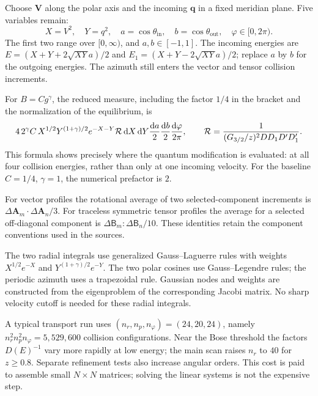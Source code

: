 Choose $\mathbf V$ along the polar axis and the incoming $\mathbf q$ in
a fixed meridian plane. Five variables remain:
\begin{equation}
 X=V^2,\quad Y=q^2,\quad
 a=\cos\theta_{\mathrm{in}},\quad b=\cos\theta_{\mathrm{out}},\quad
 \varphi\in[0,2\pi).
\end{equation}
The first two range over $[0,\infty)$, and $a,b\in[-1,1]$.
The incoming energies are
$E=(X+Y+2\sqrt{XY}a)/2$ and $E_1=(X+Y-2\sqrt{XY}a)/2$;
replace $a$ by $b$ for the outgoing energies. The azimuth still enters
the vector and tensor collision increments.

For $B=Cg^\gamma$, the reduced measure, including the factor $1/4$ in the
bracket and the normalization of the equilibrium, is
\begin{equation}
 4\,2^\gamma C\,
 X^{1/2}Y^{(1+\gamma)/2}e^{-X-Y}
 \mathcal R\,\mathrm d X\,\mathrm d Y\frac{\mathrm da}{2}\frac{\mathrm db}{2}
 \frac{\mathrm d\varphi}{2\pi},\qquad
 \mathcal R=\frac{1}{(G_{3/2}/z)^2DD_1D'D_1'}.
 \label{qt:measure}
\end{equation}
This formula shows precisely where the quantum modification is evaluated:
at all four collision energies, rather than only at one incoming velocity.
For the baseline $C=1/4$, $\gamma=1$, the numerical prefactor is $2$.

For vector profiles the rotational average of two selected-component
increments is $\Delta\mathbf A_m\cdot\Delta\mathbf A_n/3$.
For traceless symmetric tensor profiles the average for a selected
off-diagonal component is $\Delta\mathsf B_m:\Delta\mathsf B_n/10$.
These identities retain the component conventions used in the sources.

The two radial integrals use generalized Gauss--Laguerre rules with weights
$X^{1/2}e^{-X}$ and $Y^{(1+\gamma)/2}e^{-Y}$. The two polar cosines use
Gauss--Legendre rules; the periodic azimuth uses a trapezoidal rule. Gaussian
nodes and weights are constructed from the eigenproblem of the corresponding
Jacobi matrix. No sharp velocity cutoff is needed for these radial integrals.

A typical transport run uses $(n_r,n_p,n_\varphi)=(24,20,24)$, namely
$n_r^2n_p^2n_\varphi=5{,}529{,}600$ collision configurations. Near the Bose
threshold the factors $D(E)^{-1}$ vary more rapidly at low energy; the main
scan raises $n_r$ to $40$ for $z\geq0.8$. Separate refinement tests also
increase angular orders. This cost is paid to assemble small $N\times N$
matrices; solving the linear systems is not the expensive step.

